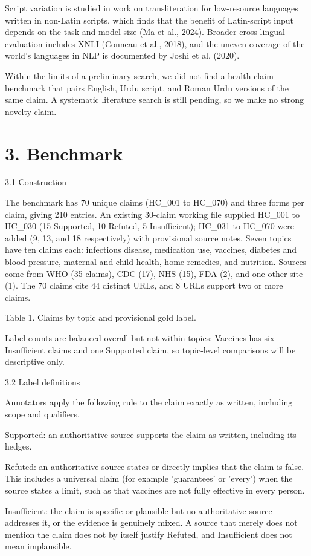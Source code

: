 \documentclass[10pt,a4paper]{article}
\begin{document}
Script variation is studied in work on transliteration for low-resource languages written in non-Latin scripts, which finds that the benefit of Latin-script input depends on the task and model size (Ma et al., 2024). Broader cross-lingual evaluation includes XNLI (Conneau et al., 2018), and the uneven coverage of the world's languages in NLP is documented by Joshi et al. (2020).

Within the limits of a preliminary search, we did not find a health-claim benchmark that pairs English, Urdu script, and Roman Urdu versions of the same claim. A systematic literature search is still pending, so we make no strong novelty claim.

\section{3. Benchmark}
3.1 Construction

The benchmark has 70 unique claims (HC\_001 to HC\_070) and three forms per claim, giving 210 entries. An existing 30-claim working file supplied HC\_001 to HC\_030 (15 Supported, 10 Refuted, 5 Insufficient); HC\_031 to HC\_070 were added (9, 13, and 18 respectively) with provisional source notes. Seven topics have ten claims each: infectious disease, medication use, vaccines, diabetes and blood pressure, maternal and child health, home remedies, and nutrition. Sources come from WHO (35 claims), CDC (17), NHS (15), FDA (2), and one other site (1). The 70 claims cite 44 distinct URLs, and 8 URLs support two or more claims.

Table 1. Claims by topic and provisional gold label.

Label counts are balanced overall but not within topics: Vaccines has six Insufficient claims and one Supported claim, so topic-level comparisons will be descriptive only.

3.2 Label definitions

Annotators apply the following rule to the claim exactly as written, including scope and qualifiers.

Supported: an authoritative source supports the claim as written, including its hedges.

Refuted: an authoritative source states or directly implies that the claim is false. This includes a universal claim (for example 'guarantees' or 'every') when the source states a limit, such as that vaccines are not fully effective in every person.

Insufficient: the claim is specific or plausible but no authoritative source addresses it, or the evidence is genuinely mixed. A source that merely does not mention the claim does not by itself justify Refuted, and Insufficient does not mean implausible.
\end{document}
